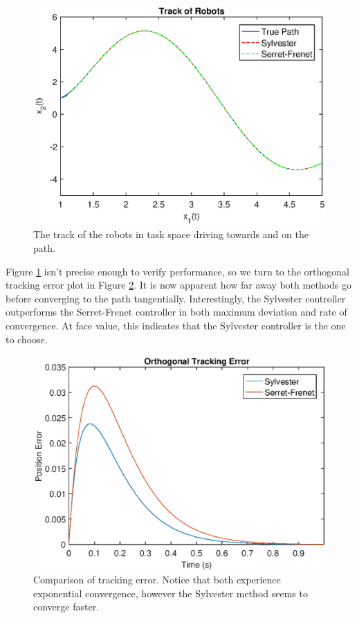\documentclass[oneside, 11pt]{book}
\begin{document}
\begin{figure}[!htbp]
    \centering
    \includegraphics{images/tfl_compare_task.eps}
    \caption{The track of the robots in task space driving towards and on the path.}
    \label{fig:tfl_compare_task}
\end{figure}

Figure \ref{fig:tfl_compare_task} isn't precise enough to verify performance, so we turn to the orthogonal tracking error plot in Figure \ref{fig:tfl_compare_tracking}. It is now apparent how far away both methods go before converging to the path tangentially. Interestingly, the Sylvester controller outperforms the Serret-Frenet controller in both maximum deviation and rate of convergence. At face value, this indicates that the Sylvester controller is the one to choose.

\begin{figure}[!htbp]
    \centering
    \includegraphics{images/tfl_compare_tracking.eps}
    \caption{Comparison of tracking error. Notice that both experience exponential convergence, however the Sylvester method seems to converge faster.}
    \label{fig:tfl_compare_tracking}
\end{figure}
\end{document}
